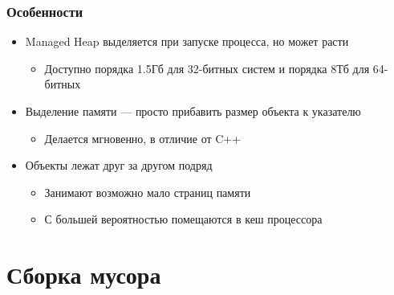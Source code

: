 \documentclass{../../slides-style}
\begin{document}
    \begin{frame}
        \frametitle{Особенности}
        \begin{itemize}
            \item Managed Heap выделяется при запуске процесса, но может расти
            \begin{itemize}
                \item Доступно порядка 1.5Гб для 32-битных систем и порядка 8Тб для 64-битных
            \end{itemize}
            \item Выделение памяти --- просто прибавить размер объекта к указателю
            \begin{itemize}
                \item Делается мгновенно, в отличие от C++
            \end{itemize}
            \item Объекты лежат друг за другом подряд
            \begin{itemize}
                \item Занимают возможно мало страниц памяти
                \item С большей вероятностью помещаются в кеш процессора
            \end{itemize}
        \end{itemize}
    \end{frame}

    \section{Сборка мусора}
\end{document}
